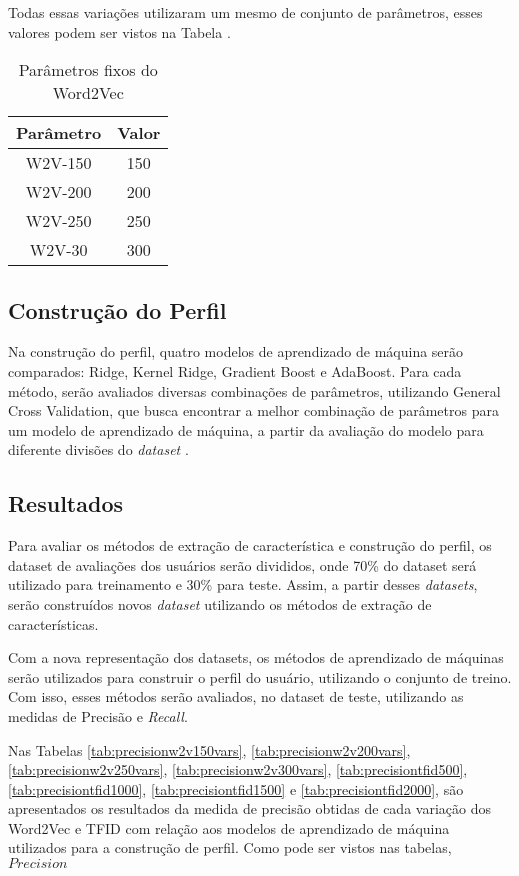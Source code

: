 Todas essas variações utilizaram um mesmo de conjunto de parâmetros, esses valores podem ser vistos na Tabela \label{tab:w2v_fix_vars}.

\begin{table}[H]
\label{tab:w2v_vars}
\centering
\begin{tabular}{|c| c|}
\hline
Parâmetro &  Valor  \\ 
\hline
W2V-150 &  150 \\
\hline
W2V-200 & 200 \\
\hline
W2V-250 &  250 \\
\hline   
W2V-30 & 300 \\
\hline 
\end{tabular}
\caption{Parâmetros fixos do Word2Vec}
\end{table}
\subsection{Construção do Perfil}
Na construção do perfil, quatro modelos de aprendizado  de máquina serão comparados: Ridge, Kernel Ridge, Gradient Boost e AdaBoost. Para cada método, serão avaliados diversas combinações de parâmetros, utilizando General Cross Validation, que busca  encontrar a melhor combinação de  parâmetros para um modelo de aprendizado de máquina, a partir da avaliação do modelo para diferente divisões do \textit{dataset} \cite{kohavi1995study}.

\subsection{Resultados}
Para avaliar os métodos de extração de característica e construção do perfil, os dataset de avaliações dos usuários serão divididos, onde 70\% do dataset será utilizado para treinamento e 30\% para teste. Assim, a partir desses \textit{datasets}, serão construídos novos \textit{
dataset} utilizando os métodos de extração de características.

Com a nova representação  dos datasets, os métodos de aprendizado de máquinas serão utilizados para construir o perfil do usuário, utilizando o conjunto de treino. Com isso, esses métodos serão avaliados, no dataset de teste, utilizando as medidas de Precisão e \textit{Recall}.

Nas Tabelas \ref{tab:precisionw2v150vars}, \ref{tab:precisionw2v200vars}, \ref{tab:precisionw2v250vars}, \ref{tab:precisionw2v300vars}, \ref{tab:precisiontfid500}, \ref{tab:precisiontfid1000}, \ref{tab:precisiontfid1500} e \ref{tab:precisiontfid2000}, são apresentados os resultados da medida de precisão obtidas de cada variação dos Word2Vec e TFID com relação aos modelos de aprendizado de máquina utilizados para a construção de perfil. Como pode ser vistos nas tabelas, 
$ Precision $


